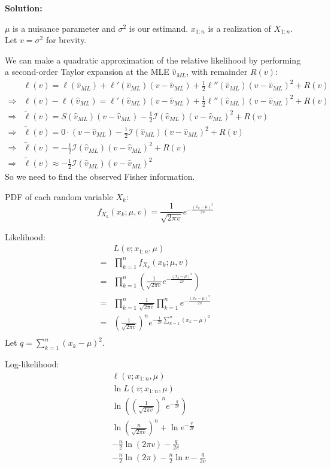\documentclass{article}
\begin{document}
\textbf{Solution:}
\begin{ssolution}
\(\mu\) is a nuisance parameter and \(\sigma^2\) is our estimand. \(x_{1:n}\) is a realization of \(X_{1:n}\). Let \(v=\sigma^2\) for brevity.

We can make a quadratic approximation of the relative likelihood by performing a
second-order Taylor expansion at the MLE \(\hat{v}_{ML}\), with remainder \(R(v)\):
\begin{align*}
	& \ell(v) = \ell(\hat{v}_{ML}) + \ell'(\hat{v}_{ML})(v-\hat{v}_{ML})+\frac12\ell''(\hat{v}_{ML})(v-\hat{v}_{ML})^2+R(v) \\
	\Rightarrow& \ell(v)-\ell(\hat{v}_{ML}) = \ell'(\hat{v}_{ML})(v-\hat{v}_{ML})+\frac12\ell''(\hat{v}_{ML})(v-\hat{v}_{ML})^2+R(v) \\
	\Rightarrow& \tilde{\ell}(v) = S(\hat{v}_{ML})(v-\hat{v}_{ML})-\frac12\mathcal{I}(\hat{v}_{ML})(v-\hat{v}_{ML})^2+R(v) \\
	\Rightarrow& \tilde{\ell}(v) = 0\cdot (v-\hat{v}_{ML})-\frac12\mathcal{I}(\hat{v}_{ML})(v-\hat{v}_{ML})^2+R(v) \\
	\Rightarrow& \tilde{\ell}(v) = -\frac12\mathcal{I}(\hat{v}_{ML})(v-\hat{v}_{ML})^2+R(v) \\
	\Rightarrow& \tilde{\ell}(v) \approx -\frac12\mathcal{I}(\hat{v}_{ML})(v-\hat{v}_{ML})^2
\end{align*}
So we need to find the observed Fisher information.

PDF of each random variable \(X_k\):
\[f_{X_k}(x_k;\mu,v) = \frac{1}{\sqrt{2\pi v}}e^{-\frac{(x_k-\mu)^2}{2v}}\]

Likelihood:
\begin{align*}
	& L(v;x_{1:n},\mu) \\
	=& \prod_{k=1}^n f_{X_k}(x_k;\mu,v) \\
	=& \prod_{k=1}^n \left(\frac{1}{\sqrt{2\pi v}}e^{-\frac{(x_k-\mu)^2}{2v}}\right) \\
	=& \prod_{k=1}^n \frac{1}{\sqrt{2\pi v}}\prod_{k=1}^ne^{-\frac{(x_k-\mu)^2}{2v}} \\
	=& \left(\frac{1}{\sqrt{2\pi v}}\right)^n e^{-\frac{1}{2v}\sum_{k=1}^n(x_k-\mu)^2} \\
\end{align*}
Let \(q=\sum_{k=1}^n (x_k-\mu)^2\).

Log-likelihood:
\begin{align*}
	& \ell(v;x_{1:n}, \mu) \\
	& \ln L(v;x_{1:n}, \mu) \\
	& \ln \left( \left(\frac{1}{\sqrt{2\pi v}}\right)^n e^{-\frac{q}{2v}} \right) \\
	& \ln \left(\frac{n}{\sqrt{2\pi v}}\right)^n + \ln e^{-\frac{q}{2v}} \\
	& -\frac{n}{2} \ln (2\pi v) - \frac{q}{2v} \\
	& -\frac{n}{2}\ln(2\pi) -\frac{n}{2}\ln v - \frac{q}{2v}
\end{align*}


\end{ssolution}
\end{document}
